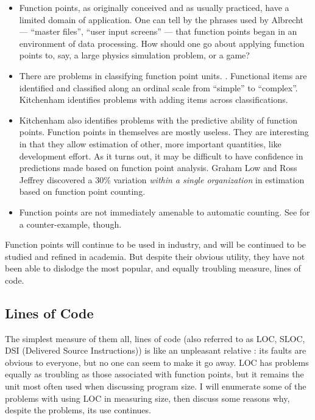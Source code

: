 \begin{itemize}
 
\item Function points, as originally conceived and as usually
practiced, have a limited domain of application.  One can tell by the
phrases used by Albrecht --- ``master files'', ``user input screens'' --- 
that function points began in an environment of data processing.
How should one go about applying function points to, say, a large
physics simulation problem, or a game?  

\item There are problems in classifying function point
units. \cite{Kitchenham97}.  Functional items are identified and classified 
along an ordinal scale from ``simple'' to ``complex''.  Kitchenham
identifies problems with adding items across classifications.

\item Kitchenham also identifies problems with the predictive ability 
of function points.  Function points in themselves are mostly
useless.  They are interesting in that they allow estimation of other, 
more important quantities, like development effort.  As it turns out,
it may be difficult to have confidence in predictions made based on
function point analysis.  Graham Low and Ross Jeffrey discovered a 30\% 
variation {\em within a single organization} in estimation based on
function point counting.

\item Function points are not immediately amenable to automatic
  counting.  See \cite{Banker} for a counter-example, though.

\end{itemize}

Function points will continue to be used in industry, and will be
continued to be studied and refined in academia.  But despite their obvious
utility, they have not been able to dislodge the most popular, and
equally troubling measure, lines of code.


\subsection{Lines of Code}

The simplest measure of them all, lines of code (also referred to as
LOC, SLOC, DSI (Delivered Source Instructions)) is like an unpleasant
relative : its faults are obvious to everyone, but no one can seem to 
make it go away.  LOC has problems equally as troubling as those
associated with function points, but it remains the unit most often
used when discussing program size.  I will enumerate some of the
problems with using LOC in measuring size, then discuss some reasons
why, despite the problems, its use continues.

